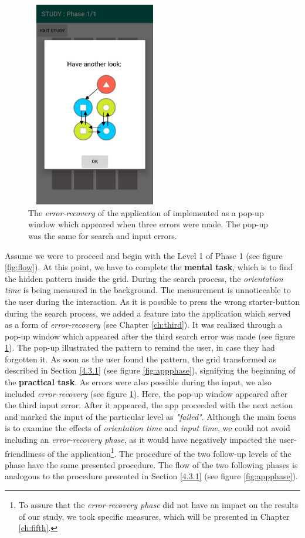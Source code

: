 \begin{figure}[t!]
\centering
\includegraphics[width=6cm, height=9cm]{Chapters/graphics/error.jpg}
\caption{The \textit{error-recovery} of the application of implemented as a pop-up window which appeared when three errors were made. The pop-up was the same for search and input errors.}
\label{fig:errorpopup}
\end{figure}

Assume we were to proceed and begin with the Level 1 of Phase 1 (see figure \ref{fig:flow}). At this point, we have to complete the \textbf{mental task}, which is to find the hidden pattern inside the grid. During the search process, the \textit{orientation time} is being measured in the background. The measurement is unnoticeable to the user during the interaction. As it is possible to press the wrong starter-button during the search process, we added a feature into the application which served as a form of \textit{error-recovery} (see Chapter \ref{ch:third}). It was realized through a pop-up window which appeared after the third search error was made (see figure \ref{fig:errorpopup}). The pop-up illustrated the pattern to remind the user, in case they had forgotten it. As soon as the user found the pattern, the grid transformed as described in Section \ref{4.3.1} (see figure \ref{fig:appphase}), signifying the beginning of the \textbf{practical task}. As errors were also possible during the input, we also included \textit{error-recovery} (see figure \ref{fig:errorpopup}). Here, the pop-up window appeared after the third input error. After it appeared, the app proceeded with the next action and marked the input of the particular level as \textit{"failed"}. Although the main focus is to examine the effects of \textit{orientation time} and \textit{input time}, we could not avoid including an \textit{error-recovery phase}, as it would have negatively impacted the user-friendliness of the application\footnote{To assure that the \textit{error-recovery phase} did not have an impact on the results of our study, we took specific measures, which will be presented in Chapter \ref{ch:fifth}.}. The procedure of the two follow-up levels of the phase have the same presented procedure. The flow of the two following phases is analogous to the procedure presented in Section \ref{4.3.1} (see figure \ref{fig:appphase}).  \\





